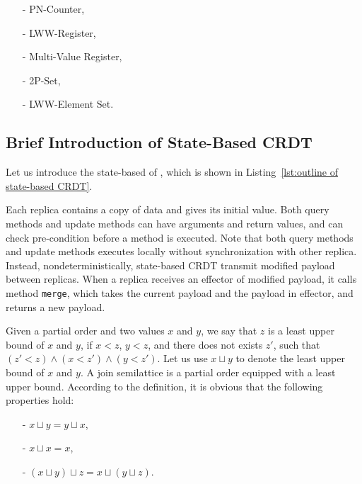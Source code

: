 \begin{itemize}
\setlength{\itemsep}{0.5pt}
\item[-] PN-Counter,

\item[-] LWW-Register,

\item[-] Multi-Value Register,

\item[-] 2P-Set,

\item[-] LWW-Element Set.
\end{itemize}




\subsection{Brief Introduction of State-Based CRDT}
\label{subsec:brief introduction of state-baed CRDT}

Let us introduce the state-based \crdtimp{} of \cite{ShapiroPBZ11}, which is shown in Listing~\ref{lst:outline of state-based CRDT}.

Each replica contains a copy of data and gives its initial value. Both query methods and update methods can have arguments and return values, and can check pre-condition before a method is executed. Note that both query methods and update methods executes locally without synchronization with other replica. Instead, nondeterministically, state-based CRDT transmit modified payload between replicas. When a replica receives an effector of modified payload, it calls method {\tt merge}, which takes the current payload and the payload in effector, and returns a new payload.

Given a partial order and two values $x$ and $y$, we say that $z$ is a least upper bound of $x$ and $y$, if $x<z$, $y<z$, and there does not exists $z'$, such that $(z'<z) \wedge (x<z') \wedge (y<z')$. Let us use $x \sqcup y$ to denote the least upper bound of $x$ and $y$. A join semilattice is a partial order equipped with a least upper bound. According to the definition, it is obvious that the following properties hold:

\begin{itemize}
\setlength{\itemsep}{0.5pt}
\item[-] $x \sqcup y = y \sqcup x$,

\item[-] $x \sqcup x = x$,

\item[-] $(x \sqcup y) \sqcup z = x \sqcup (y \sqcup z)$.
\end{itemize}

